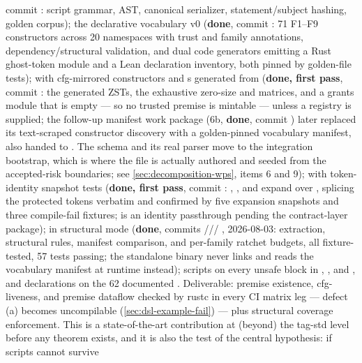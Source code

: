 \begin{description}
  commit : script grammar, AST, canonical serializer,
  statement/subject hashing, golden corpus); the declarative
  vocabulary v0 (\textbf{done}, commit : 71 F1--F9
  constructors across 20 namespaces with trust and family annotations,
  dependency/structural validation, and dual code generators emitting
  a  Rust ghost-token module and a Lean declaration
  inventory, both pinned by golden-file tests);
   with cfg-mirrored constructors and
  s generated from  (\textbf{done,
  first pass}, commit : the generated ZSTs, the
  exhaustive zero-size and  matrices, and a grants module
  that is empty --- so no trusted premise is mintable --- unless a
  registry is supplied; the follow-up manifest work package (6b,
  \textbf{done}, commit ) later replaced its text-scraped
  constructor discovery with a golden-pinned vocabulary manifest, also
  handed to . The  schema and its real
  parser move to the integration bootstrap, which is where the file is
  actually authored and seeded from the accepted-risk boundaries;
  see \cref{sec:decomposition-wps}, items 6 and 9); 
  with token-identity snapshot tests (\textbf{done, first pass}, commit
  : , , and 
  expand over , splicing the protected tokens verbatim
  and confirmed by five expansion snapshots and three compile-fail
  fixtures;  is an identity passthrough pending the
  contract-layer package);  in structural mode
  (\textbf{done}, commits ///%
  , 2026-08-03: extraction, structural rules, manifest
  comparison, and per-family ratchet budgets, all fixture-tested, 57
  tests passing; the standalone binary never links 
  and reads the vocabulary manifest at runtime instead); scripts
  on every unsafe block in , ,
  and , and 
  declarations on the 62 documented . Deliverable:
  premise existence, cfg-liveness, and premise dataflow checked by
  rustc in every CI matrix leg --- defect (a) becomes uncompilable
  (\cref{sec:dsl-example-fail}) --- plus structural coverage
  enforcement. This is a state-of-the-art contribution at (beyond) the
  tag-std level~\cite{tagstd2025} before any theorem exists, and it is
  also the test of the central hypothesis: if scripts cannot survive

\end{description}

